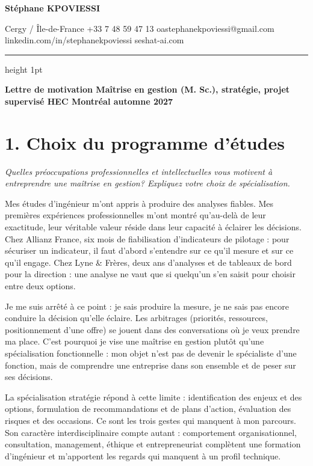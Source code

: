 \documentclass[12pt,a4paper]{article}
\begin{document}
\thispagestyle{empty}

{\LARGE\bfseries Stéphane KPOVIESSI}\par
\vspace{0.25em}
{\footnotesize\color{muted}Cergy / Île-de-France \textbullet{} +33 7 48 59 47 13 \textbullet{} oastephanekpoviessi@gmail.com\\
linkedin.com/in/stephanekpoviessi \textbullet{} seshat-ai.com}\par
\vspace{0.25em}
{\color{rule}\hrule height 1pt}
\vspace{0.3em}

{\bfseries Lettre de motivation \textbullet{} Maîtrise en gestion (M. Sc.), stratégie, projet supervisé \textbullet{} HEC Montréal \textbullet{} automne 2027}\par

\section{1. Choix du programme d'études}
{\itshape\footnotesize Quelles préoccupations professionnelles et intellectuelles vous motivent à entreprendre une maîtrise en gestion? Expliquez votre choix de spécialisation.}\par
\vspace{0.2em}

Mes études d'ingénieur m'ont appris à produire des analyses fiables. Mes premières expériences professionnelles m'ont montré qu'au-delà de leur exactitude, leur véritable valeur réside dans leur capacité à éclairer les décisions. Chez Allianz France, six mois de fiabilisation d'indicateurs de pilotage : pour sécuriser un indicateur, il faut d'abord s'entendre sur ce qu'il mesure et sur ce qu'il engage. Chez Lyne \& Frères, deux ans d'analyses et de tableaux de bord pour la direction : une analyse ne vaut que si quelqu'un s'en saisit pour choisir entre deux options.

Je me suis arrêté à ce point : je sais produire la mesure, je ne sais pas encore conduire la décision qu'elle éclaire. Les arbitrages (priorités, ressources, positionnement d'une offre) se jouent dans des conversations où je veux prendre ma place. C'est pourquoi je vise une maîtrise en gestion plutôt qu'une spécialisation fonctionnelle : mon objet n'est pas de devenir le spécialiste d'une fonction, mais de comprendre une entreprise dans son ensemble et de peser sur ses décisions.

La spécialisation stratégie répond à cette limite : identification des enjeux et des options, formulation de recommandations et de plans d'action, évaluation des risques et des occasions. Ce sont les trois gestes qui manquent à mon parcours. Son caractère interdisciplinaire compte autant : comportement organisationnel, consultation, management, éthique et entrepreneuriat complètent une formation d'ingénieur et m'apportent les regards qui manquent à un profil technique.
\end{document}

